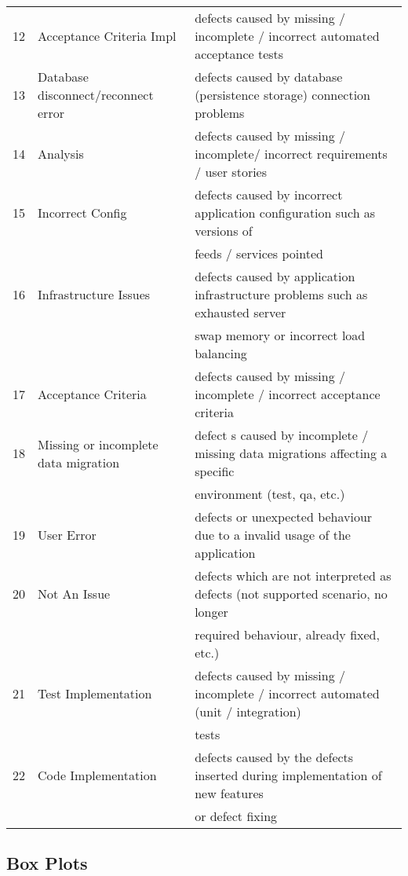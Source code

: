 \documentclass[times]{smrauth}
\begin{document}
\begin{table*}[h]
\begin{center}
{\begin{tabular}{lll}
12 & Acceptance Criteria Impl &  defects caused by missing / incomplete / incorrect automated acceptance tests  \\
13  & Database disconnect/reconnect error &  defects caused by database (persistence storage) connection problems    \\
14  & Analysis &  defects caused by missing / incomplete/ incorrect requirements / user stories \\
15  & Incorrect Config &  defects caused by incorrect application configuration such as versions of \\&& feeds / services pointed  \\
16  & Infrastructure Issues &  defects caused by application infrastructure problems such as exhausted server \\&& swap memory or  incorrect load balancing \\
17  & Acceptance Criteria &  defects caused by missing / incomplete / incorrect acceptance criteria \\
18  & Missing or incomplete data migration &  defect s caused by incomplete / missing data migrations affecting a specific \\&& environment (test, qa, etc.)  \\
19  & User Error &  defects or unexpected behaviour due to a invalid usage of the application \\
20  & Not An Issue &   defects which are not interpreted as  defects (not supported scenario, no longer \\&& required behaviour, already fixed, etc.) \\
21  & Test Implementation &  defects caused by missing / incomplete / incorrect automated (unit / integration) \\&& tests \\
22  & Code Implementation &  defects caused by the defects inserted during implementation of new features \\&& or  defect fixing \\

   \hline
\end{tabular}
}
\end{center}
\end{table*}

\newpage
\subsection{Box Plots}
\end{document}
